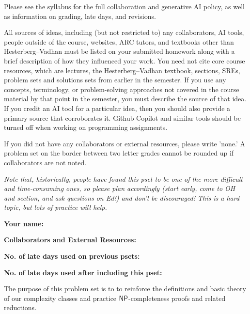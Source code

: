\documentclass[11pt]{article}
\begin{document}

Please see the syllabus for the full collaboration and generative AI policy, as well as information on grading, late days, and revisions.

All sources of ideas, including (but not restricted to) any collaborators, AI tools, people outside of the course, websites, ARC tutors, and textbooks other than Hesterberg--Vadhan must be listed on your submitted homework along with a brief description of how they influenced your work. You need not cite core course resources, which are lectures, the Hesterberg--Vadhan textbook, sections, SREs, problem sets and solutions sets from earlier in the semester. If you use any concepts, terminology, or problem-solving approaches not covered in the course material by that point in the semester, you must describe the source of that idea. If you credit an AI tool for a particular idea, then you should also provide a primary source that corroborates it. Github Copilot and similar tools should be turned off when working on programming assignments.

If you did not have any collaborators or external resources, please write 'none.' A problem set on the border between two letter grades cannot be rounded up if collaborators are not noted.

\emph{Note that, historically, people have found this pset to be one of the more difficult and time-consuming ones, so please plan accordingly (start early, come to OH and section, and ask questions on Ed!) and don't be discouraged! This is a hard topic, but lots of practice will help.}

\vspace{1em}

\textbf{Your name: }

\textbf{Collaborators and External Resources:}

\textbf{No. of late days used on previous psets: }

\textbf{No. of late days used after including this pset: }

\vspace{0.2in}

\noindent The purpose of this problem set is to to reinforce the definitions and basic theory of our complexity classes and practice $\mathsf{NP}$-completeness proofs and related reductions. 
\end{document}
